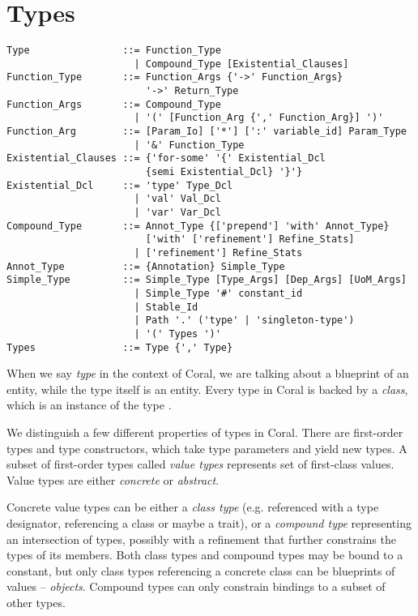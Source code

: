 
\chapter{Types}

\syntax\begin{lstlisting}
Type                ::= Function_Type
                      | Compound_Type [Existential_Clauses]
Function_Type       ::= Function_Args {'->' Function_Args} 
                        '->' Return_Type
Function_Args       ::= Compound_Type
                      | '(' [Function_Arg {',' Function_Arg}] ')'
Function_Arg        ::= [Param_Io] ['*'] [':' variable_id] Param_Type
                      | '&' Function_Type
Existential_Clauses ::= {'for-some' '{' Existential_Dcl
                        {semi Existential_Dcl} '}'}
Existential_Dcl     ::= 'type' Type_Dcl
                      | 'val' Val_Dcl
                      | 'var' Var_Dcl
Compound_Type       ::= Annot_Type {['prepend'] 'with' Annot_Type} 
                        ['with' ['refinement'] Refine_Stats]
                      | ['refinement'] Refine_Stats
Annot_Type          ::= {Annotation} Simple_Type
Simple_Type         ::= Simple_Type [Type_Args] [Dep_Args] [UoM_Args]
                      | Simple_Type '#' constant_id
                      | Stable_Id
                      | Path '.' ('type' | 'singleton-type')
                      | '(' Types ')'
Types               ::= Type {',' Type}
\end{lstlisting}

When we say \textit{type} in the context of Coral, we are talking about a blueprint of an entity, while the type itself is an entity. Every type in Coral is backed by a \textit{class}, which is an instance of the type \lstinline@Class@. 

We distinguish a few different properties of types in Coral. There are first-order types and type constructors, which take type parameters and yield new types. A subset of first-order types called \textit{value types} represents set of first-class values. Value types are either \textit{concrete} or \textit{abstract}. 

Concrete value types can be either a \textit{class type} (e.g. referenced with a type designator, referencing a class or maybe a trait), or a \textit{compound type} representing an intersection of types, possibly with a refinement that further constrains the types of its members. Both class types and compound types may be bound to a constant, but only class types referencing a concrete class can be blueprints of values -- \textit{objects}. Compound types can only constrain bindings to a subset of other types. 

